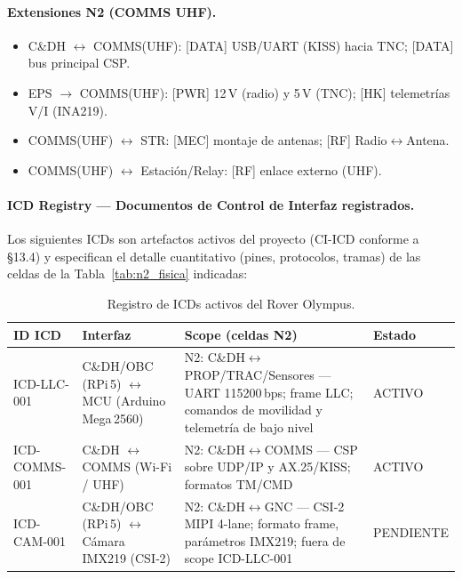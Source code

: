 \begin{landscape}
\begin{longtable}{|p{2.3cm}||p{2.9cm}|p{2.9cm}|p{2.9cm}|p{2.9cm}|p{2.9cm}|p{2.9cm}|p{2.9cm}|}
\end{longtable}
\end{landscape}

\paragraph{Extensiones N2 (COMMS UHF).}
\begin{itemize}
  \item C\&DH $\leftrightarrow$ COMMS(UHF): [DATA] USB/UART (KISS) hacia TNC; [DATA] bus principal CSP.
  \item EPS $\rightarrow$ COMMS(UHF): [PWR] 12\,V (radio) y 5\,V (TNC); [HK] telemetrías V/I (INA219).
  \item COMMS(UHF) $\leftrightarrow$ STR: [MEC] montaje de antenas; [RF] Radio$\leftrightarrow$Antena.
  \item COMMS(UHF) $\leftrightarrow$ Estación/Relay: [RF] enlace externo (UHF).
\end{itemize}

\paragraph{ICD Registry — Documentos de Control de Interfaz registrados.}
Los siguientes ICDs son artefactos activos del proyecto (CI-ICD conforme a §13.4) y especifican el detalle cuantitativo (pines, protocolos, tramas) de las celdas de la Tabla~\ref{tab:n2_fisica} indicadas:

\begin{table}[H]
\centering
\small
\begin{tabularx}{\textwidth}{| l | l | X | l |}
\hline
\textbf{ID ICD} & \textbf{Interfaz} & \textbf{Scope (celdas N2)} & \textbf{Estado} \\ \hline
ICD-LLC-001 & C\&DH/OBC (RPi\,5) $\leftrightarrow$ MCU (Arduino Mega\,2560) & N2: C\&DH$\leftrightarrow$PROP/\allowbreak TRAC/\allowbreak Sensores — UART 115200\,bps; frame LLC; comandos de movilidad y telemetría de bajo nivel & ACTIVO \\ \hline
ICD-COMMS-001 & C\&DH $\leftrightarrow$ COMMS (Wi-Fi / UHF) & N2: C\&DH$\leftrightarrow$COMMS — CSP sobre UDP/IP y AX.25/KISS; formatos TM/CMD & ACTIVO \\ \hline
ICD-CAM-001 & C\&DH/OBC (RPi\,5) $\leftrightarrow$ Cámara IMX219 (CSI‑2) & N2: C\&DH$\leftrightarrow$GNC — CSI‑2 MIPI 4-lane; formato frame, parámetros IMX219; fuera de scope ICD-LLC-001 & PENDIENTE \\ \hline
\end{tabularx}
\caption{Registro de ICDs activos del Rover Olympus.}
\label{tab:icd_registry}
\end{table}





